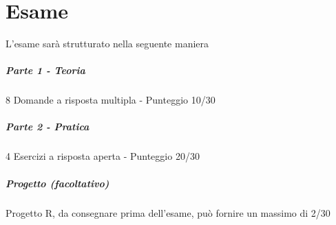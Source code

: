 \documentclass[12pt, a4paper, openany]{book}
\begin{document}
\chapter{Esame}
L'esame sarà strutturato nella seguente maniera
\paragraph{Parte 1 - Teoria}
8 Domande a risposta multipla - Punteggio 10/30
\paragraph{Parte 2 - Pratica}
4 Esercizi a risposta aperta - Punteggio 20/30
\paragraph{Progetto (facoltativo)}
Progetto R, da consegnare prima dell'esame, può fornire un massimo di 2/30
\end{document}
